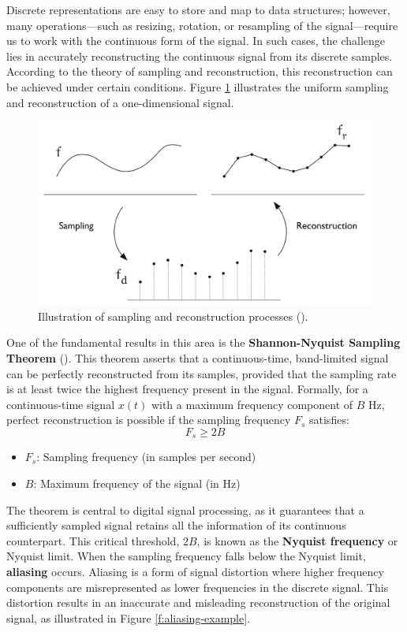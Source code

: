 Discrete representations are easy to store and map to data structures; however, many operations—such as resizing, rotation, or resampling of the signal—require us to work with the continuous form of the signal. In such cases, the challenge lies in accurately reconstructing the continuous signal from its discrete samples. According to the theory of sampling and reconstruction, this reconstruction can be achieved under certain conditions. Figure \ref{f:sampling-reconstuction} illustrates the uniform sampling and reconstruction of a one-dimensional signal.


\begin{figure}[!h]
  \centering
  \includegraphics[width=0.85\linewidth]{img/ch2/sampling-reconstruction.png}
  \caption{Illustration of sampling and reconstruction processes (\cite{ipcgVelho2014}).}
  \label{f:sampling-reconstuction}
\end{figure}


One of the fundamental results in this area is the \textbf{Shannon-Nyquist Sampling Theorem} (\cite{Shannon1949}). This theorem asserts that a continuous-time, band-limited signal can be perfectly reconstructed from its samples, provided that the sampling rate is at least twice the highest frequency present in the signal. Formally, for a continuous-time signal \( x(t) \) with a maximum frequency component of \( B \) Hz, perfect reconstruction is possible if the sampling frequency \( F_s \) satisfies:
\[
F_s \geq 2B
\]

\begin{itemize}
  \item \( F_s \): Sampling frequency (in samples per second)
  \item \( B \): Maximum frequency of the signal (in Hz)
\end{itemize}

The theorem is central to digital signal processing, as it guarantees that a sufficiently sampled signal retains all the information of its continuous counterpart. This critical threshold, \( 2B \), is known as the \textbf{Nyquist frequency} or Nyquist limit. When the sampling frequency falls below the Nyquist limit, \textbf{aliasing} occurs. Aliasing is a form of signal distortion where higher frequency components are misrepresented as lower frequencies in the discrete signal. This distortion results in an inaccurate and misleading reconstruction of the original signal, as illustrated in Figure \ref{f:aliasing-example}.

